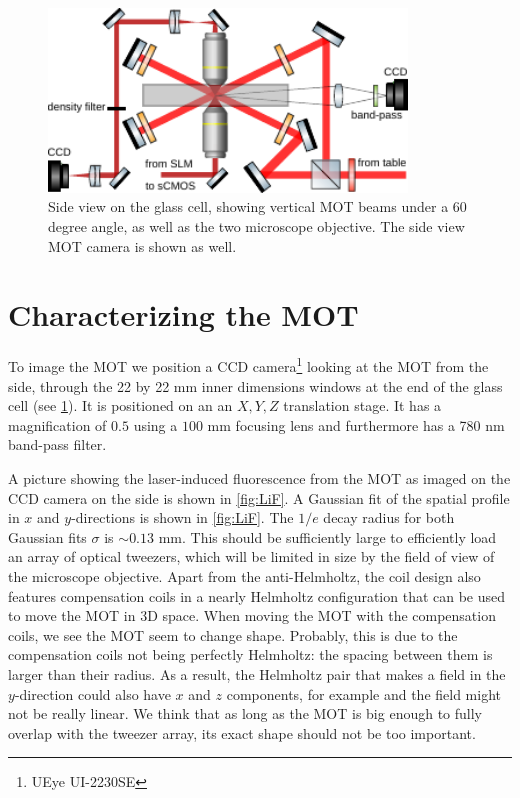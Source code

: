 \begin{figure}
    \centering
    \includegraphics[width=0.85\textwidth]{figures/MOTsideview.pdf}
    \caption{Side view on the glass cell, showing vertical MOT beams under a 60 degree angle, as well as the two microscope objective. 
    The side view MOT camera is shown as well.}
    \label{fig:GlassCellSide}
\end{figure}


\section{Characterizing the MOT}\label{sec:MOTresult}

To image the MOT we position a CCD camera\footnote{UEye UI-2230SE} looking at the MOT from the side, through the 22 by 22 mm inner dimensions windows at the end of the glass cell (see \cref{fig:GlassCellSide}).
It is positioned on an an $X,Y,Z$ translation stage.
It has a magnification of $0.5$ using a $100$ mm focusing lens and furthermore has a 780 nm band-pass filter. 

A picture showing the laser-induced fluorescence from the MOT as imaged on the CCD camera on the side is shown in \cref{fig:LiF}.
A Gaussian fit of the spatial profile in $x$ and $y$-directions is shown in \cref{fig:LiF}.
The $1/e$ decay radius for both Gaussian fits $\sigma$ is $\sim 0.13$ mm. 
This should be sufficiently large to efficiently load an array of optical tweezers, which will be limited in size by the field of view of the microscope objective. 
Apart from the anti-Helmholtz, the coil design also features compensation coils in a nearly Helmholtz configuration that can be used to move the MOT in 3D space. 
When moving the MOT with the compensation coils, we see the MOT seem to change shape. 
Probably, this is due to the compensation coils not being perfectly Helmholtz: the spacing between them is larger than their radius.  
As a result, the Helmholtz pair that makes a field in the $y$-direction could also have $x$ and $z$ components, for example and the field might not be really linear. 
We think that as long as the MOT is big enough to fully overlap with the tweezer array, its exact shape should not be too important.


